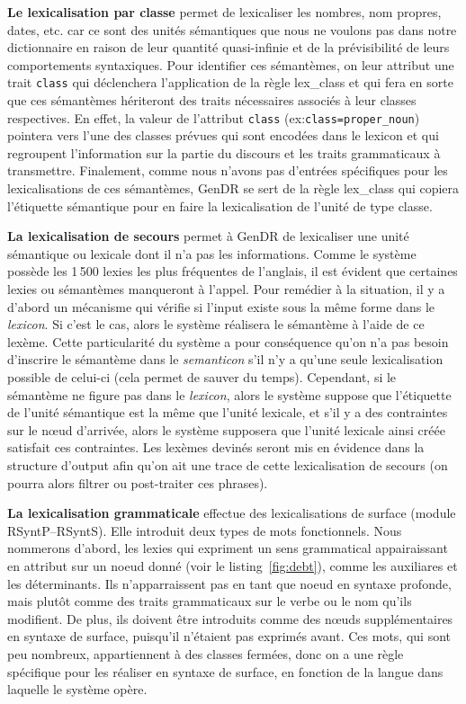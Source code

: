 \textbf{Le lexicalisation par classe} permet de lexicaliser les nombres, nom propres, dates, etc. car ce sont des unités sémantiques que nous ne voulons pas dans notre dictionnaire en raison de leur quantité quasi-infinie et de la prévisibilité de leurs comportements syntaxiques. Pour identifier ces sémantèmes, on leur attribut une trait \texttt{class} qui déclenchera l'application de la règle lex\_class et qui fera en sorte que ces sémantèmes hériteront des traits nécessaires associés à leur classes respectives. En effet, la valeur de l'attribut \texttt{class} (ex:\texttt{class=proper\_noun}) pointera vers l'une des classes prévues qui sont encodées dans le lexicon et qui regroupent l'information sur la partie du discours et les traits grammaticaux à transmettre. Finalement, comme nous n'avons pas d'entrées spécifiques pour les lexicalisations de ces sémantèmes, GenDR se sert de la règle lex\_class qui copiera l'étiquette sémantique pour en faire la lexicalisation de l'unité de type classe.

\textbf{La lexicalisation de secours} 
permet à GenDR de lexicaliser une unité sémantique ou lexicale dont il n'a pas les informations. Comme le système possède les 1\,500 lexies les plus fréquentes de l'anglais, il est évident que certaines lexies ou sémantèmes manqueront à l'appel. Pour remédier à la situation, il y a d'abord un mécanisme qui vérifie si l'input existe sous la même forme dans le \emph{lexicon}. Si c'est le cas, alors le système réalisera le sémantème à l'aide de ce lexème. Cette particularité du système a pour conséquence qu'on n'a pas besoin d'inscrire le sémantème dans le \emph{semanticon} s'il n'y a qu'une seule lexicalisation possible de celui-ci (cela permet de sauver du temps). Cependant, si le sémantème ne figure pas dans le \emph{lexicon}, alors le système suppose que l'étiquette de l'unité sémantique est la même que l'unité lexicale, et s'il y a des contraintes sur le n\oe{}ud d'arrivée, alors le système supposera que l'unité lexicale ainsi créée satisfait ces contraintes. Les lexèmes devinés seront mis en évidence dans la structure d'output afin qu'on ait une trace de cette lexicalisation de secours (on pourra alors filtrer ou post-traiter ces phrases).

\textbf{La lexicalisation grammaticale}
effectue des lexicalisations de surface (module \ac{RSyntP}--\ac{RSyntS}). Elle introduit deux types de mots fonctionnels. Nous nommerons d'abord, les lexies qui expriment un sens grammatical appairaissant en attribut sur un noeud donné (voir le listing~\ref{fig:debt}), comme les auxiliares et les déterminants. Ils n'apparraissent pas en tant que noeud en syntaxe profonde, mais plutôt comme des traits grammaticaux sur le verbe ou le nom qu'ils modifient. De plus, ils doivent être introduits comme des n\oe{}uds supplémentaires en syntaxe de surface, puisqu'il n'étaient pas exprimés avant. Ces mots, qui sont peu nombreux, appartiennent à des classes fermées, donc on a une règle spécifique pour les réaliser en syntaxe de surface, en fonction de la langue dans laquelle le système opère.

